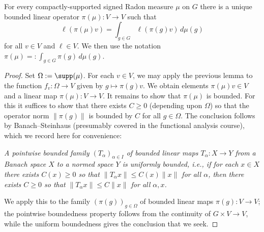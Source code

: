 \documentclass[reqno]{amsart} 
\begin{document}
\begin{lemma}
  For every compactly-supported signed Radon measure $\mu$ on $G$ there is a unique bounded linear operator $\pi(\mu) : V \rightarrow V$ such that
  \begin{equation*}
    \ell(\pi(\mu) v)
    = \int_{g \in G} \ell(\pi(g) v) \, d \mu(g)
  \end{equation*}
  for all $v \in V$ and $\ell \in V$.  We then use the notation $\pi(\mu) =: \int_{g \in G} \pi(g) \, d \mu(g)$.
\end{lemma}
\begin{proof}
  Set $\Omega := \supp(\mu)$.  For each $v \in V$, we may apply the previous lemma to the function $f_v : \Omega \rightarrow V$ given by $g \mapsto \pi(g) v$.  We obtain elements $\pi(\mu) v \in V$ and a linear map $\pi(\mu) : V \rightarrow V$.  It remains to show that $\pi(\mu)$ is bounded.  For this it suffices to show that there exists $C \geq 0$ (depending upon $\Omega$) so that the operator norm $\|\pi(g)\|$ is bounded by $C$ for all $g \in \Omega$.  The conclusion follows by Banach--Steinhaus (presumably covered in the functional analysis course), which we record here for convenience:
  \begin{center}
    \emph{A pointwise bounded family $(T_\alpha)_{\alpha \in I}$ of bounded linear maps $T_\alpha : X \rightarrow Y$ from a Banach space $X$ to a normed space $Y$ is uniformly bounded, i.e., if for each $x \in X$ there exists $C(x) \geq 0$ so that $\|T_\alpha x\| \leq C(x) \|x\|$ for all $\alpha$, then there exists $C \geq 0$ so that $\|T_\alpha x\| \leq C \|x\|$ for all $\alpha,x$.}
  \end{center}
  We apply this to the family $(\pi(g))_{g \in \Omega}$ of bounded linear maps $\pi(g) : V \rightarrow V$; the pointwise boundedness property follows from the continuity of $G \times V \rightarrow V$, while the uniform boundedness gives the conclusion that we seek.


\end{proof}
\end{document}
